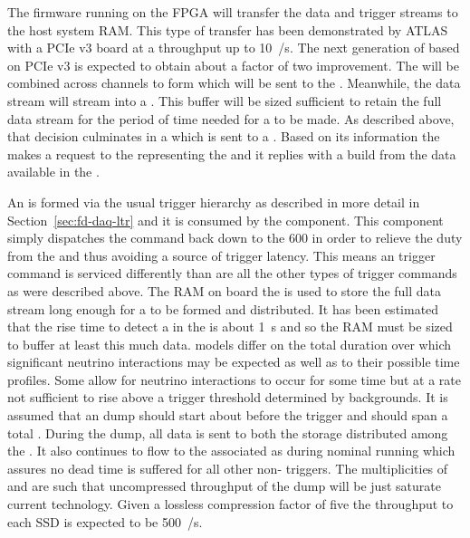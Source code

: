 The firmware running on the  FPGA will transfer the data
and trigger streams to the host system RAM. 
This type of transfer has been demonstrated by ATLAS with a PCIe v3
 board at a throughput up to \SI{10}{\GB/\s}. 
The next generation of  based on PCIe v3 is expected to
obtain about a factor of two improvement.
The  will be combined across channels to form
 which will be sent to the .
Meanwhile, the data stream will stream into a . 
This buffer will be sized sufficient to retain the full data stream
for the period of time needed for a  to be made. 
As described above, that decision culminates in a 
which is sent to a . 
Based on its information the  makes a request to the
 representing the  and it replies with a
 build from the data available in the .

An   is formed via the usual trigger
hierarchy as described in more detail in Section~\ref{sec:fd-daq-ltr}
and it is consumed by the  component. 
This component simply dispatches the command back down to the 600
 in order to relieve the duty from the  and
thus avoiding a source of trigger latency.
This means an  trigger command is serviced differently than
are all the other types of trigger commands as were described above.
The RAM on board the  is used to store the full data
stream long enough for a   to be formed
and distributed. 
It has been estimated that the rise time to detect a  in
the   is about \SI{1}{\s} and so the RAM
must be sized to buffer at least this much data.
 models differ on the total duration over which significant
neutrino interactions may be expected as well as to their possible
time profiles. 
Some allow for  neutrino interactions to occur for some
time but at a rate not sufficient to rise above a trigger threshold
determined by  backgrounds. 
It is assumed that an  dump should start about \snbpretime
before the  trigger and should span a total \snbtime.
During the dump, all data is sent to both the  storage
distributed among the . 
It also continues to flow to the associated  as during
nominal running which assures no dead time is suffered for all other
non- triggers. 
The multiplicities of  and  are such that
uncompressed throughput of the  dump will be just saturate
current technology. 
Given a lossless compression factor of five the throughput to each SSD
is expected to be \SI{500}{\MB/\s}.

